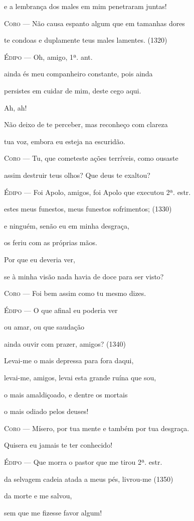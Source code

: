 e a lembrança dos males em mim penetraram juntas!

\textsc{Coro} --- Não causa espanto algum que em tamanhas dores

te condoas e duplamente teus males lamentes. (1320)

\textsc{Édipo} --- Oh, amigo, 1ª. ant.

ainda és meu companheiro constante, pois ainda

persistes em cuidar de mim, deste cego aqui.

Ah, ah!

Não deixo de te perceber, mas reconheço com clareza

tua voz, embora eu esteja na escuridão.

\textsc{Coro} --- Tu, que cometeste ações terríveis, como ousaste

assim destruir teus olhos? Que deus te exaltou?

\textsc{Édipo} --- Foi Apolo, amigos, foi Apolo que executou 2ª. estr.

estes meus funestos, meus funestos sofrimentos; (1330)

e ninguém, senão eu em minha desgraça,

os feriu com as próprias mãos.

Por que eu deveria ver,

se à minha visão nada havia de doce para ser visto?

\textsc{Coro} --- Foi bem assim como tu mesmo dizes.

\textsc{Édipo} --- O que afinal eu poderia ver

ou amar, ou que saudação

ainda ouvir com prazer, amigos? (1340)

Levai-me o mais depressa para fora daqui,

levai-me, amigos, levai esta grande ruína que sou,

o mais amaldiçoado, e dentre os mortais

o mais odiado pelos deuses!

\textsc{Coro} --- Mísero, por tua mente e também por tua desgraça.

Quisera eu jamais te ter conhecido!

\textsc{Édipo} --- Que morra o pastor que me tirou 2ª. estr.

da selvagem cadeia atada a meus pés, livrou-me (1350)

da morte e me salvou,

sem que me fizesse favor algum!

